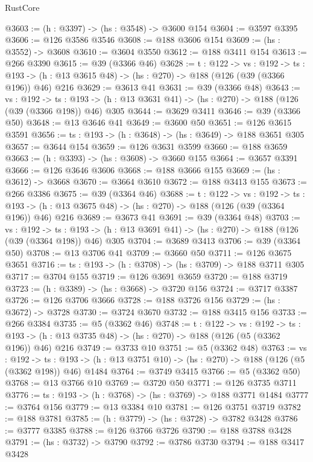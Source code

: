 \begin{lexlean}{RustCore}
\begin{coremodule}
@3603 := (h : @3397) -> (hs : @3548) -> @3600 @154
@3604 := @3597 @3395
@3606 := @126 @3586 @3546
@3608 := @188 @3606 @154
@3609 := (hs : @3552) -> @3608
@3610 := @3604 @3550
@3612 := @188 @3411 @154
@3613 := @266 @3390
@3615 := @39 (@3366 @46)
@3628 := {t : @122} ->
  {vs : @192} ->
  {ts : @193} -> (h : @13 @3615 @48) -> (hs : @270) -> @188 (@126 (@39 (@3366 @196)) @46) @216
@3629 := @3613 @41
@3631 := @39 (@3366 @48)
@3643 := {vs : @192} ->
  {ts : @193} -> (h : @13 @3631 @41) -> (hs : @270) -> @188 (@126 (@39 (@3366 @198)) @46) @305
@3644 := @3629 @3411
@3646 := @39 (@3366 @50)
@3648 := @13 @3646 @41
@3649 := @3600 @50
@3651 := @126 @3615 @3591
@3656 := {ts : @193} -> (h : @3648) -> (hs : @3649) -> @188 @3651 @305
@3657 := @3644 @154
@3659 := @126 @3631 @3599
@3660 := @188 @3659
@3663 := (h : @3393) -> (hs : @3608) -> @3660 @155
@3664 := @3657 @3391
@3666 := @126 @3646 @3606
@3668 := @188 @3666 @155
@3669 := (hs : @3612) -> @3668
@3670 := @3664 @3610
@3672 := @188 @3413 @155
@3673 := @266 @3386
@3675 := @39 (@3364 @46)
@3688 := {t : @122} ->
  {vs : @192} ->
  {ts : @193} -> (h : @13 @3675 @48) -> (hs : @270) -> @188 (@126 (@39 (@3364 @196)) @46) @216
@3689 := @3673 @41
@3691 := @39 (@3364 @48)
@3703 := {vs : @192} ->
  {ts : @193} -> (h : @13 @3691 @41) -> (hs : @270) -> @188 (@126 (@39 (@3364 @198)) @46) @305
@3704 := @3689 @3413
@3706 := @39 (@3364 @50)
@3708 := @13 @3706 @41
@3709 := @3660 @50
@3711 := @126 @3675 @3651
@3716 := {ts : @193} -> (h : @3708) -> (hs : @3709) -> @188 @3711 @305
@3717 := @3704 @155
@3719 := @126 @3691 @3659
@3720 := @188 @3719
@3723 := (h : @3389) -> (hs : @3668) -> @3720 @156
@3724 := @3717 @3387
@3726 := @126 @3706 @3666
@3728 := @188 @3726 @156
@3729 := (hs : @3672) -> @3728
@3730 := @3724 @3670
@3732 := @188 @3415 @156
@3733 := @266 @3384
@3735 := @5 (@3362 @46)
@3748 := {t : @122} ->
  {vs : @192} ->
  {ts : @193} -> (h : @13 @3735 @48) -> (hs : @270) -> @188 (@126 (@5 (@3362 @196)) @46) @216
@3749 := @3733 @10
@3751 := @5 (@3362 @48)
@3763 := {vs : @192} ->
  {ts : @193} -> (h : @13 @3751 @10) -> (hs : @270) -> @188 (@126 (@5 (@3362 @198)) @46) @1484
@3764 := @3749 @3415
@3766 := @5 (@3362 @50)
@3768 := @13 @3766 @10
@3769 := @3720 @50
@3771 := @126 @3735 @3711
@3776 := {ts : @193} -> (h : @3768) -> (hs : @3769) -> @188 @3771 @1484
@3777 := @3764 @156
@3779 := @13 @3384 @10
@3781 := @126 @3751 @3719
@3782 := @188 @3781
@3785 := (h : @3779) -> (hs : @3728) -> @3782 @3428
@3786 := @3777 @3385
@3788 := @126 @3766 @3726
@3790 := @188 @3788 @3428
@3791 := (hs : @3732) -> @3790
@3792 := @3786 @3730
@3794 := @188 @3417 @3428

\end{coremodule}
\end{lexlean}
